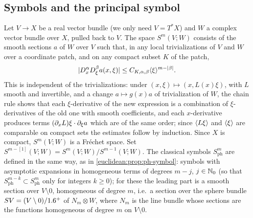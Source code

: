 \subsection{Symbols and the principal symbol}
Let $V\to X$ be a real vector bundle (we only need $V=T^*X$) and $W$ a complex
vector bundle over $X$, pulled back to $V$. The space $S^m(V;W)$ consists of
the smooth sections $a$ of $W$ over $V$ such that, in any local trivializations of
$V$ and $W$ over a coordinate patch, and on any compact subset $K$ of the patch,
\begin{equation*}
|D^\alpha_xD^\beta_\xi a(x,\xi)|\le C_{K,\alpha,\beta}\langle \xi\rangle^{m-|\beta|}.
\end{equation*}
This is independent of the trivializations: under
$(x,\xi)\mapsto(x,L(x)\xi)$, with $L$ smooth and invertible, and a change
$a\mapsto g(x)a$ of trivialization of $W$, the chain rule shows that each
$\xi$-derivative of the new expression is a combination of $\xi$-derivatives of
the old one with smooth coefficients, and each $x$-derivative produces terms
$(\partial_xL)\xi\cdot\partial_\xi a$ which are of the same order; since $\langle L\xi\rangle$ and
$\langle \xi\rangle$ are comparable on compact sets the estimates follow by induction. Since $X$
is compact, $S^m(V;W)$ is a Fr\'echet space. Set
$S^{m-[1]}(V;W)=S^m(V;W)/S^{m-1}(V;W)$. The classical symbols $S^m_{\mathrm{ph}}$
are defined in the same way, as in \cref{euclidean:prop:ph-symbol}: symbols with
asymptotic expansions in homogeneous terms of degrees $m-j$, $j\in\mathbb{N}_0$ (so that
$S^{m-k}_{\mathrm{ph}}\subset S^m_{\mathrm{ph}}$ only for integers $k\ge0$); for these the leading part is a smooth section over
$V\setminus0$, homogeneous of degree $m$, i.e.\ a section over the sphere bundle
$SV=(V\setminus0)/1.6^+$ of $N_m\otimes W$, where $N_m$ is the line bundle whose
sections are the functions homogeneous of degree $m$ on $V\setminus0$.

